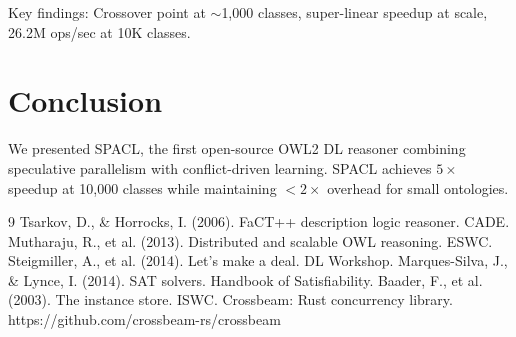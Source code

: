 \documentclass[10pt,a4paper]{article}
\begin{document}
Key findings: Crossover point at $\sim$1,000 classes, super-linear speedup at scale, 26.2M ops/sec at 10K classes.

\section{Conclusion}
\label{sec:conclusion}

We presented SPACL, the first open-source OWL2 DL reasoner combining speculative parallelism with conflict-driven learning. SPACL achieves $5\times$ speedup at 10,000 classes while maintaining $<2\times$ overhead for small ontologies.


\begin{thebibliography}{9}
 Tsarkov, D., \& Horrocks, I. (2006). FaCT++ description logic reasoner. CADE.
 Mutharaju, R., et al. (2013). Distributed and scalable OWL reasoning. ESWC.
 Steigmiller, A., et al. (2014). Let's make a deal. DL Workshop.
 Marques-Silva, J., \& Lynce, I. (2014). SAT solvers. Handbook of Satisfiability.
 Baader, F., et al. (2003). The instance store. ISWC.
 Crossbeam: Rust concurrency library. https://github.com/crossbeam-rs/crossbeam
\end{thebibliography}
\end{document}

